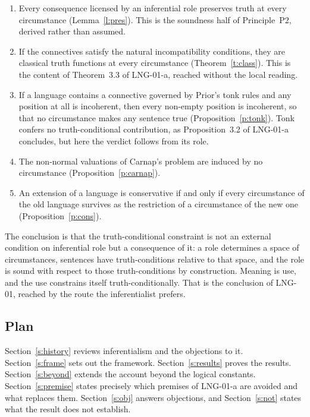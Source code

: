 \documentclass{situationist-preprint}
\begin{document}
\begin{enumerate}[label=(\roman*)]
\item Every consequence licensed by an inferential role preserves truth at every circumstance (Lemma~\ref{l:pres}). This is the soundness half of Principle~P2, derived rather than assumed.
\item If the connectives satisfy the natural incompatibility conditions, they are classical truth functions at every circumstance (Theorem~\ref{t:class}). This is the content of Theorem~3.3 of LNG-01-a, reached without the local reading.
\item If a language contains a connective governed by Prior's tonk rules and any position at all is incoherent, then every non-empty position is incoherent, so that no circumstance makes any sentence true (Proposition~\ref{p:tonk}). Tonk confers no truth-conditional contribution, as Proposition~3.2 of LNG-01-a concludes, but here the verdict follows from its role.
\item The non-normal valuations of Carnap's problem are induced by no circumstance (Proposition~\ref{p:carnap}).
\item An extension of a language is conservative if and only if every circumstance of the old language survives as the restriction of a circumstance of the new one (Proposition~\ref{p:cons}).
\end{enumerate}

The conclusion is that the truth-conditional constraint is not an external condition on inferential role but a consequence of it: a role determines a space of circumstances, sentences have truth-conditions relative to that space, and the role is sound with respect to those truth-conditions by construction. Meaning is use, and the use constrains itself truth-conditionally. That is the conclusion of LNG-01, reached by the route the inferentialist prefers.

\subsection{Plan}

Section~\ref{s:history} reviews inferentialism and the objections to it. Section~\ref{s:frame} sets out the framework. Section~\ref{s:results} proves the results. Section~\ref{s:beyond} extends the account beyond the logical constants. Section~\ref{s:premise} states precisely which premises of LNG-01-a are avoided and what replaces them. Section~\ref{s:obj} answers objections, and Section~\ref{s:not} states what the result does not establish.
\end{document}
